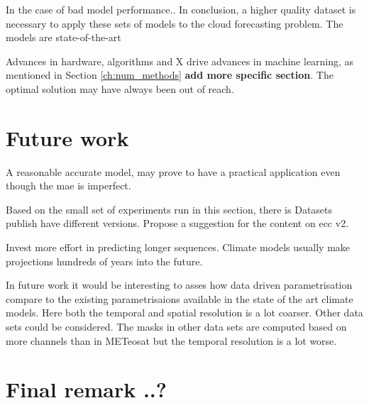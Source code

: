 In the case of bad model performance.. In conclusion, a higher quality dataset is necessary to apply these sets of models to the cloud forecasting problem. The models are state-of-the-art 

Advances in hardware, algorithms and X drive advances in machine learning, as mentioned in Section \ref{ch:num_methods} \textbf{add more specific section}. The optimal solution may have always been out of reach. 

\section{Future work}
A reasonable accurate model, may prove to have a practical application even though the \acrshort{mae} is imperfect. 

Based on the small set of experiments run in this section, there is 
Datasets publish have different versions. Propose a suggestion for the content on \acrshort{ecc} v2.

Invest more effort in predicting longer sequences. Climate models usually make projections hundreds of years into the future.

In future work it would be interesting to asses how data driven parametrisation compare to the existing parametrisaions available in the state of the art climate models. Here both the temporal and spatial resolution is a lot coarser. Other data sets could be considered. The masks in other data sets are computed based on more channels than in METeosat but the temporal resolution is a lot worse. 



\section{Final remark ..? }
